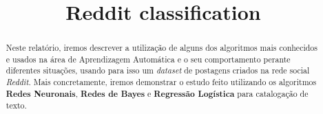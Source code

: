 \documentclass[conference]{IEEEtran}
\begin{document}
\title{Reddit classification}

\author{
\and
{}
}

\maketitle

\begin{abstract}

Neste relatório, iremos descrever a utilização de alguns dos algoritmos mais conhecidos e usados na área de Aprendizagem Automática e o seu comportamento perante diferentes situações, usando para isso um \textit{dataset} de postagens criados na rede social \textit{Reddit}. Mais concretamente, iremos demonstrar o estudo feito utilizando os algoritmos \textbf{Redes Neuronais}, \textbf{Redes de Bayes} e \textbf{Regressão Logística} para catalogação de texto.

\end{abstract}


% 

% 








\end{document}
